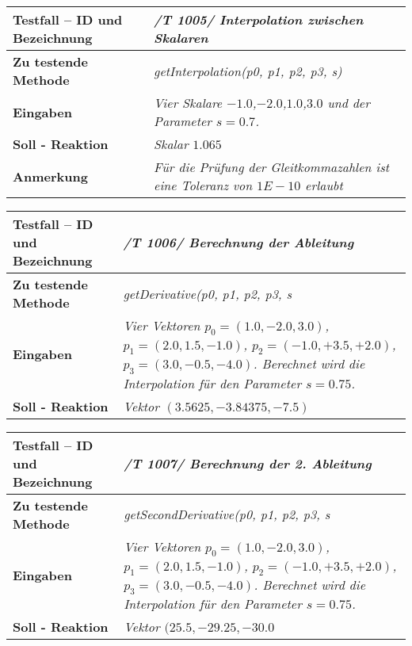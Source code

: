 \begin{longtable}{|p{7cm}|p{10cm}|}
\hline
\textbf{Testfall -- ID und Bezeichnung} & \textit{ /T 1005/ Interpolation zwischen Skalaren} \\
\hline
\textbf{Zu testende Methode} &  \textit{getInterpolation(p0, p1, p2, p3, s)} \\
\hline
\textbf{Eingaben} & \textit{Vier Skalare $-1.0$,$-2.0$,$1.0$,$3.0$ und der Parameter $s=0.7$.}\\
\hline
\textbf{Soll - Reaktion} & \textit{Skalar $1.065$}\\
\hline
\textbf{Anmerkung} & \textit{Für die Prüfung der Gleitkommazahlen ist eine 
Toleranz von $1E-10$ erlaubt} \\
\hline
\end{longtable}

\begin{longtable}{|p{7cm}|p{10cm}|}
\hline
\textbf{Testfall -- ID und Bezeichnung} & \textit{ /T 1006/ Berechnung der Ableitung} \\
\hline
\textbf{Zu testende Methode} &  \textit{getDerivative(p0, p1, p2, p3, s} \\
\hline
\textbf{Eingaben} & \textit{Vier Vektoren $p_0 = (1.0, -2.0, 3.0)$,
$p_1 = (2.0, 1.5, -1.0)$, $p_2 = (-1.0, +3.5, +2.0)$, $p_3 = (3.0, -0.5, -4.0)$. 
Berechnet wird die Interpolation für den Parameter $s = 0.75$.}\\
\hline
\textbf{Soll - Reaktion} & \textit{Vektor $(3.5625,-3.84375, -7.5)$}\\
\hline
\end{longtable}

\begin{longtable}{|p{7cm}|p{10cm}|}
\hline
\textbf{Testfall -- ID und Bezeichnung} & \textit{ /T 1007/ Berechnung der 2. Ableitung} \\
\hline
\textbf{Zu testende Methode} &  \textit{getSecondDerivative(p0, p1, p2, p3, s} \\
\hline
\textbf{Eingaben} & \textit{Vier Vektoren $p_0 = (1.0, -2.0, 3.0)$,
$p_1 = (2.0, 1.5, -1.0)$, $p_2 = (-1.0, +3.5, +2.0)$, $p_3 = (3.0, -0.5, -4.0)$. 
Berechnet wird die Interpolation für den Parameter $s = 0.75$.}\\
\hline
\textbf{Soll - Reaktion} & \textit{Vektor $(25.5,-29.25, -30.0$}\\
\hline
\end{longtable}

